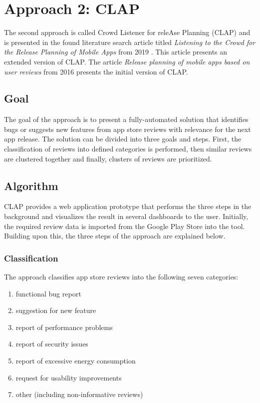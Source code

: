 \section{Approach 2: CLAP}\label{sec:02_approach_2_clap}

The second approach is called Crowd Listener for releAse Planning (CLAP) and is presented in the found literature search article titled \textit{Listening to the Crowd for the Release Planning of Mobile Apps} from 2019 \cite{Scalabrino.2019}. This article presents an extended version of CLAP. The article \textit{Release planning of mobile apps based on user reviews} from 2016 \cite{Villarroel.2016} presents the initial version of CLAP.

\subsection{Goal}

The goal of the approach is to present a fully-automated solution that identifies bugs or suggests new features from app store reviews with relevance for the next app release. The solution can be divided into three goals and steps. First, the classification of reviews into defined categories is performed, then similar reviews are clustered together and finally, clusters of reviews are prioritized. 

\subsection{Algorithm}

CLAP provides a web application prototype that performs the three steps in the background and visualizes the result in several dashboards to the user.  
Initially, the required review data is imported from the Google Play Store into the tool. Building upon this, the three steps of the approach are explained below.

\subsubsection{Classification}

The approach classifies app store reviews into the following seven categories:
\begin{enumerate}
    \item functional bug report
    \item suggestion for new feature
    \item report of performance problems
    \item report of security issues
    \item report of excessive energy consumption
    \item request for usability improvements 
    \item other (including non-informative reviews)
\end{enumerate}

